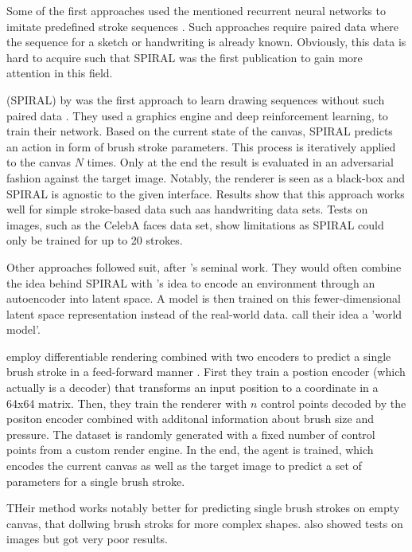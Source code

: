 Some of the first approaches used the mentioned recurrent neural networks to imitate predefined stroke sequences \cite{sketchRNN, graves}.
Such approaches require paired data where the sequence for a sketch or handwriting is already known.
Obviously, this data is hard to acquire such that SPIRAL was the first publication to gain more attention in this field.

 (SPIRAL) by \citeauthor*{SPIRAL} was the first approach to learn drawing sequences without such paired data \cite{SPIRAL}.
They used a graphics engine and deep reinforcement learning, to train their network.
Based on the current state of the canvas, SPIRAL predicts an action in form of brush stroke parameters.
This process is iteratively applied to the canvas $N$ times.
Only at the end the result is evaluated in an adversarial fashion against the target image.
Notably, the renderer is seen as a black-box and SPIRAL is agnostic to the given interface.
Results show that this approach works well for simple stroke-based data such aas handwriting data sets.
Tests on images, such as the CelebA faces data set, show limitations as SPIRAL could only be trained for up to 20 strokes.


Other approaches followed suit, after \citeauthor*{SPIRAL}'s seminal work.
They would often combine the idea behind SPIRAL with \citeauthor{worldmodel}'s idea to encode an environment through an autoencoder into latent space.
A model is then trained on this fewer-dimensional latent space representation instead of the real-world data.
\citeauthor{worldmodel} call their idea a 'world model'.

\citeauthor*{strokenet} employ differentiable rendering combined with two encoders to predict a single brush stroke in a feed-forward manner \cite{strokenet}.
First they train a postion encoder (which actually is a decoder) that transforms an input position to a coordinate in a 64x64 matrix.
Then, they train the renderer with $n$ control points decoded by the positon encoder combined with additonal information about brush size and pressure.
The dataset is randomly generated with a fixed number of control points from a custom render engine.
In the end, the agent is trained, which encodes the current canvas as well as the target image to predict a set of parameters for a single brush stroke.

THeir method works notably better for predicting single brush strokes on empty canvas, that dollwing brush stroks for more complex shapes.
\citeauthor*{strokenet} also showed tests on images but got very poor results.


